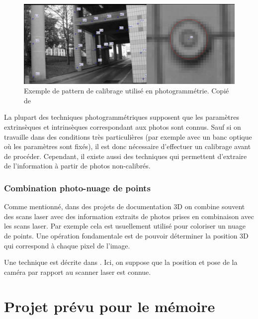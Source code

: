 \documentclass[a4paper,10pt]{scrreprt}
\begin{document}
\begin{figure}[p]
\includegraphics[width=\textwidth]{calibration_pattern.png}
\caption{Exemple de pattern de calibrage utilisé en photogrammétrie. Copié de \cite{Gard2009}}
\label{fig:calibration_pattern}
\end{figure}

La plupart des techniques photogrammétriques supposent que les paramètres extrinsèques et intrinsèques correspondant aux photos sont connus. Sauf si on travaille dans des conditions très particulières (par exemple avec un banc optique où les paramètres sont fixés), il est donc nécessaire d'effectuer un calibrage avant de procéder. Cependant, il existe aussi des techniques qui permettent d'extraire de l'information à partir de photos non-calibrés. \cite{Truc1998}




\subsection{Combination photo-nuage de points}
Comme mentionné, dans des projets de documentation 3D on combine souvent des scans laser avec des information extraits de photos prises en combinaison avec les scans laser. Par exemple cela est usuellement utilisé pour coloriser un nuage de points. Une opération fondamentale est de pouvoir déterminer la position 3D qui correspond à chaque pixel de l'image.

Une technique est décrite dans \cite{Tour2009}. Ici, on suppose que la position et pose de la caméra par rapport au scanner laser est connue.


\chapter{Projet prévu pour le mémoire}





\end{document}

